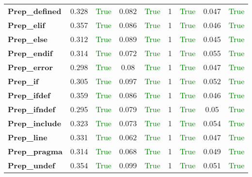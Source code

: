 \documentclass{article}
\begin{document}
\begin{xltabular}{\textwidth}{lcccccccc}
\textbf{{\fontsize{10}{12}\selectfont Prep\_defined}}& 0.328&\textcolor{green}{True}& 0.082&\textcolor{green}{True}& 1&\textcolor{green}{True}& 0.047&\textcolor{green}{True} \\[0.5ex]
\textbf{{\fontsize{10}{12}\selectfont Prep\_elif}}& 0.357&\textcolor{green}{True}& 0.086&\textcolor{green}{True}& 1&\textcolor{green}{True}& 0.046&\textcolor{green}{True} \\[0.5ex]
\textbf{{\fontsize{10}{12}\selectfont Prep\_else}}& 0.312&\textcolor{green}{True}& 0.089&\textcolor{green}{True}& 1&\textcolor{green}{True}& 0.045&\textcolor{green}{True} \\[0.5ex]
\textbf{{\fontsize{10}{12}\selectfont Prep\_endif}}& 0.314&\textcolor{green}{True}& 0.072&\textcolor{green}{True}& 1&\textcolor{green}{True}& 0.055&\textcolor{green}{True} \\[0.5ex]
\textbf{{\fontsize{10}{12}\selectfont Prep\_error}}& 0.298&\textcolor{green}{True}& 0.08&\textcolor{green}{True}& 1&\textcolor{green}{True}& 0.047&\textcolor{green}{True} \\[0.5ex]
\textbf{{\fontsize{10}{12}\selectfont Prep\_if}}& 0.305&\textcolor{green}{True}& 0.097&\textcolor{green}{True}& 1&\textcolor{green}{True}& 0.052&\textcolor{green}{True} \\[0.5ex]
\textbf{{\fontsize{10}{12}\selectfont Prep\_ifdef}}& 0.359&\textcolor{green}{True}& 0.086&\textcolor{green}{True}& 1&\textcolor{green}{True}& 0.046&\textcolor{green}{True} \\[0.5ex]
\textbf{{\fontsize{10}{12}\selectfont Prep\_ifndef}}& 0.295&\textcolor{green}{True}& 0.079&\textcolor{green}{True}& 1&\textcolor{green}{True}& 0.05&\textcolor{green}{True} \\[0.5ex]
\textbf{{\fontsize{10}{12}\selectfont Prep\_include}}& 0.323&\textcolor{green}{True}& 0.073&\textcolor{green}{True}& 1&\textcolor{green}{True}& 0.054&\textcolor{green}{True} \\[0.5ex]
\textbf{{\fontsize{10}{12}\selectfont Prep\_line}}& 0.331&\textcolor{green}{True}& 0.062&\textcolor{green}{True}& 1&\textcolor{green}{True}& 0.047&\textcolor{green}{True} \\[0.5ex]
\textbf{{\fontsize{10}{12}\selectfont Prep\_pragma}}& 0.314&\textcolor{green}{True}& 0.068&\textcolor{green}{True}& 1&\textcolor{green}{True}& 0.049&\textcolor{green}{True} \\[0.5ex]
\textbf{{\fontsize{10}{12}\selectfont Prep\_undef}}& 0.354&\textcolor{green}{True}& 0.099&\textcolor{green}{True}& 1&\textcolor{green}{True}& 0.051&\textcolor{green}{True} \\[0.5ex]

\end{xltabular}
\end{document}
